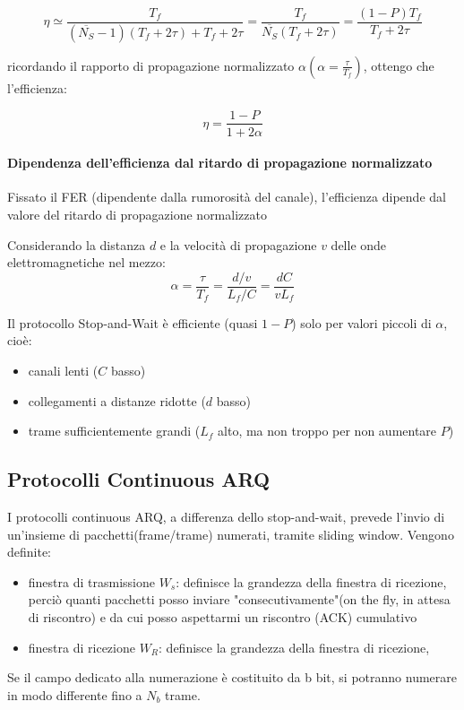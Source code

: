 \begin{equation}
\eta \simeq \frac{T_f}{(\overline{N_S} - 1)(T_f + 2\tau) + T_f + 2\tau} = \frac{T_f}{\overline{N_S}(T_f + 2\tau)} = \frac{(1-P)T_f}{T_f + 2\tau}
\end{equation}

ricordando il rapporto di propagazione normalizzato $\alpha(\alpha = \frac{\tau}{T_f} )$, ottengo che l'efficienza:

\begin{equation}
\eta = \frac{1 - P}{1 + 2\alpha}
\end{equation}

\paragraph{Dipendenza dell'efficienza dal ritardo di propagazione normalizzato}
Fissato il FER (dipendente dalla rumorosità del canale), l'efficienza dipende dal valore del ritardo di propagazione normalizzato

Considerando la distanza $d$ e la velocità di propagazione $v$ delle onde elettromagnetiche nel mezzo:
\[
\alpha = \frac{\tau}{T_f} = \frac{d/v}{L_f/C} = \frac{dC}{vL_f}
\]

Il protocollo Stop-and-Wait è efficiente (quasi $1-P$) solo per valori piccoli di $\alpha$, cioè:
\begin{itemize}
    \item canali lenti ($C$ basso) 
    \item collegamenti a distanze ridotte ($d$ basso) 
    \item trame sufficientemente grandi ($L_f$ alto, ma non troppo per non aumentare $P$)
\end{itemize}

\newpage
\subsection{Protocolli Continuous ARQ}
I protocolli continuous ARQ, a differenza dello stop-and-wait, prevede l'invio di un'insieme di pacchetti(frame/trame) numerati, tramite sliding window.
Vengono definite:
\begin{itemize}
    \item finestra di trasmissione $W_s$: definisce la grandezza della finestra di ricezione, perciò quanti pacchetti posso inviare "consecutivamente"(on the fly, in attesa di riscontro) e da cui posso aspettarmi un riscontro (ACK) cumulativo
    \item finestra di ricezione  $W_R$: definisce la grandezza della finestra di ricezione, 
\end{itemize} 
Se il campo dedicato alla numerazione è costituito da b bit, si potranno
numerare in modo differente fino a $N_b$ trame. 


